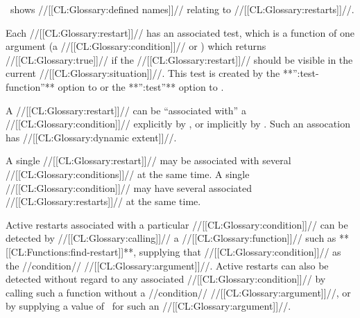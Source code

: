 \Thenextfigure\ shows //[[CL:Glossary:defined names]]// relating to
//[[CL:Glossary:restarts]]//.

 
\endsubsubsubsection%



Each //[[CL:Glossary:restart]]// has an associated test, which is a function of one
argument (a //[[CL:Glossary:condition]]// or \nil) which returns //[[CL:Glossary:true]]// if the //[[CL:Glossary:restart]]//
should be visible in the current //[[CL:Glossary:situation]]//.  This test is created by 
the **'':test-function''** option to  or 
the **'':test''** option to .


\endsubsubsubsection%


A //[[CL:Glossary:restart]]// can be ``associated with'' a //[[CL:Glossary:condition]]// explicitly
by , or implicitly by .
Such an assocation has //[[CL:Glossary:dynamic extent]]//.

A single //[[CL:Glossary:restart]]// may be associated with several //[[CL:Glossary:conditions]]// 
at the same time.
A single //[[CL:Glossary:condition]]// may have several associated //[[CL:Glossary:restarts]]//
at the same time.

Active restarts associated with a particular //[[CL:Glossary:condition]]// can be detected
by //[[CL:Glossary:calling]]// a //[[CL:Glossary:function]]// such as **[[CL:Functions:find-restart]]**, supplying
that //[[CL:Glossary:condition]]// as the //condition// //[[CL:Glossary:argument]]//.
Active restarts can also be detected without regard to any associated
//[[CL:Glossary:condition]]// by calling such a function without a //condition// //[[CL:Glossary:argument]]//,
or by supplying a value of \nil\ for such an //[[CL:Glossary:argument]]//.


\endsubsubsubsection%

